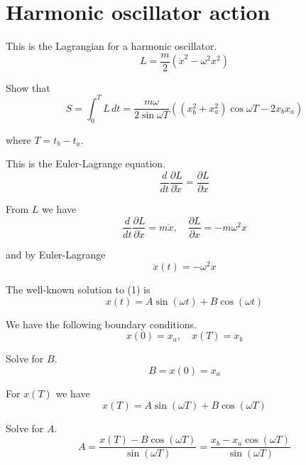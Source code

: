 

\section*{Harmonic oscillator action}

This is the Lagrangian for a harmonic oscillator.
\begin{equation*}
L=\frac{m}{2}(\dot x^2-\omega^2x^2)
\end{equation*}

Show that
\begin{equation*}
S=\int_0^TL\,dt=\frac{m\omega}{2\sin\omega T}
\left((x_b^2+x_a^2)\cos\omega T-2x_bx_a\right)
\end{equation*}

where $T=t_b-t_a$.

\bigskip
This is the Euler-Lagrange equation.
\begin{equation*}
\frac{d}{dt}\frac{\partial L}{\partial\dot x}=\frac{\partial L}{\partial x}
\end{equation*}

From $L$ we have
\begin{equation*}
\frac{d}{dt}\frac{\partial L}{\partial\dot x}=m\ddot x,\quad
\frac{\partial L}{\partial x}=-m\omega^2x
\end{equation*}

and by Euler-Lagrange
\begin{equation*}
\ddot x(t)=-\omega^2x
\tag{1}
\end{equation*}

The well-known solution to (1) is
\begin{equation*}
x(t)=A\sin(\omega t)+B\cos(\omega t)
\end{equation*}

We have the following boundary conditions.
\begin{equation*}
x(0)=x_a,\quad
x(T)=x_b
\tag{2}
\end{equation*}

Solve for $B$.
\begin{equation*}
B=x(0)=x_a
\end{equation*}

For $x(T)$ we have
\begin{equation*}
x(T)=A\sin(\omega T)+B\cos(\omega T)
\end{equation*}

Solve for $A$.
\begin{equation*}
A=\frac{x(T)-B\cos(\omega T)}{\sin(\omega T)}=
\frac{x_b-x_a\cos(\omega T)}{\sin(\omega T)}
\end{equation*}

